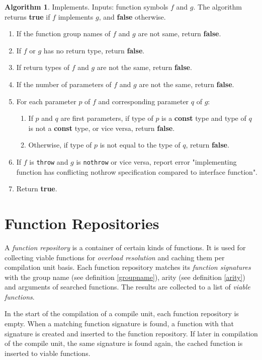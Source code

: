 \documentclass[a4paper,oneside,11pt]{book}
\theoremstyle{definition}
\newtheorem{algo}{Algorithm}[section]
\begin{document}
\begin{algo}\label{implements} Implements. Inputs: function symbols $f$ and $g$.
The algorithm returns \textbf{true} if $f$ implements $g$, and \textbf{false} otherwise.
\begin{enumerate}
\item
If the function group names of $f$ and $g$ are not same, return \textbf{false}.
\item
If $f$ or $g$ has no return type, return \textbf{false}.
\item
If return types of $f$ and $g$ are not the same, return \textbf{false}.
\item
If the number of parameters of $f$ and $g$ are not the same, return \textbf{false}.
\item
For each parameter $p$ of $f$ and corresponding parameter $q$ of $g$:
\begin{enumerate}
\item
If $p$ and $q$ are first parameters, if type of $p$ is a \textbf{const} type and type of $q$ is not a \textbf{const} type, or vice versa, return \textbf{false}.
\item
Otherwise, if type of $p$ is not equal to the type of $q$, return \textbf{false}.
\end{enumerate}
\item
If $f$ is \verb|throw| and $g$ is \verb|nothrow| or vice versa, report error "implementing function has conflicting nothrow specification compared to interface function".
\item
Return \textbf{true}.
\end{enumerate}
\end{algo}

\chapter{Function Repositories}\label{functionrepositories}

A \emph{function repository} is a container of certain kinds of functions.
It is used for collecting viable functions for \emph{overload resolution} and caching them per compilation unit basis.
Each function repository matches its \emph{function signatures} with the group name (see definition \ref{groupname}),
arity (see definition \ref{arity}) and arguments of searched functions.
The results are collected to a list of \emph{viable functions}.

In the start of the compilation of a compile unit, each function repository is empty.
When a matching function signature is found, a function with that signature is created and inserted to the function repository.
If later in compilation of the compile unit, the same signature is found again, the cached function is inserted to viable functions.
\end{document}
